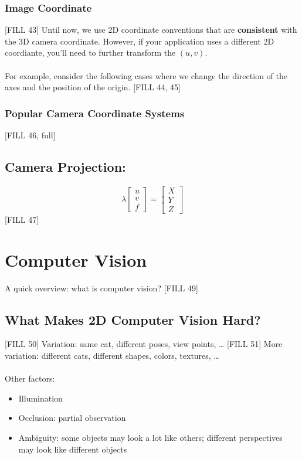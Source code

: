 \documentclass[10pt]{article}
\begin{document}
\subsubsection*{Image Coordinate}
[FILL 43]
Until now, we use 2D coordinate conventions that are \textbf{consistent} with the 3D camera coordinate.  However, if your application uses a different 2D coordiante, you'll need to further transform the $(u, v)$.\\\\
For example, consider the following cases where we change the direction of the axes and the position of the origin.
[FILL 44, 45]

\subsubsection*{Popular Camera Coordinate Systems}
[FILL 46, full]

\subsection*{Camera Projection:}
\[\lambda \begin{bmatrix} u \\ v \\ f \end{bmatrix} = \begin{bmatrix} X \\ Y \\ Z \end{bmatrix}\]
[FILL 47]

\section*{Computer Vision}
A quick overview: what is computer vision?
[FILL 49]

\subsection*{What Makes 2D Computer Vision Hard?}
[FILL 50]
Variation: same cat, different poses, view points, \dots
[FILL 51]
More variation: different cats, different shapes, colors, textures, \dots\\\\
Other factors:
\begin{itemize}
	\item Illumination
	\item Occlusion: partial observation
	\item Ambiguity: some objects may look a lot like others; different perspectives may look like different objects
\end{itemize}
\end{document}
